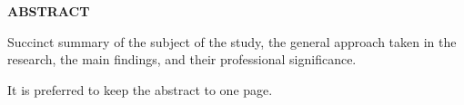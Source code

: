 \begin{center}
    {\fontsize{18pt}{0pt} \MakeUppercase{\textbf{abstract}}}
\vspace*{24pt}
\end{center}


Succinct summary of the subject of the study, the general approach taken in the research, the main findings, and their professional significance. 

It is preferred to keep the abstract to one page. 

